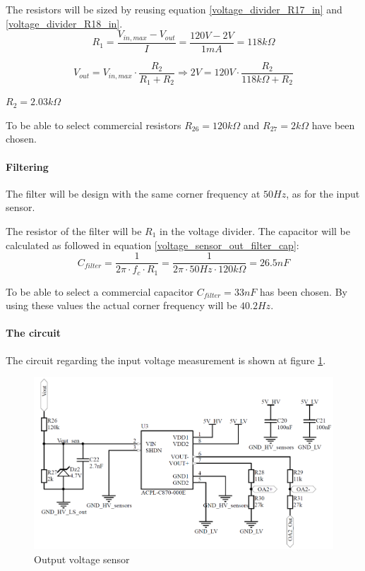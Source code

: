 \noindent The resistors will be sized by reusing equation \ref{voltage_divider_R17_in} and \ref{voltage_divider_R18_in}.
\begin{equation}
	R_{1} = \frac{V_{in,max}-V_{out}}{I} = \frac{120V-2V}{1mA} = 118k\Omega	
\end{equation}

\begin{equation} 
	V_{out} = V_{in,max} \cdot \frac{R_{2}}{R_{1}+R_{2}} \Rightarrow 2V = 120V \cdot \frac{R_{2}}{118k\Omega+R_{2}}
\end{equation}
\begin{center}
	$R_{2} = 2.03k\Omega$
\end{center}

\noindent To be able to select commercial resistors $R_{26} = 120k\Omega$ and $R_{27} = 2k\Omega$ have been chosen. 

\paragraph{Filtering}
The filter will be design with the same corner frequency at $50Hz$, as for the input sensor.

The resistor of the filter will be $R_{1}$ in the voltage divider. The capacitor will be calculated as followed in equation \ref{voltage_sensor_out_filter_cap}:
\begin{equation} \label{voltage_sensor_out_filter_cap}
	C_{filter} = \frac{1}{2\pi \cdot f_c \cdot R_{1}} = \frac{1}{2 \pi \cdot 50Hz \cdot 120k\Omega} = 26.5nF
\end{equation}

To be able to select a commercial capacitor $C_{filter} = 33nF$ has been chosen. By using these values the actual corner frequency will be $40.2 Hz$.

\paragraph{The circuit}
The circuit regarding the input voltage measurement is shown at figure \ref{fig:output_voltage_sensor_circuit}. 

\begin{figure}[H]
	\begin{center}
		\includegraphics[width=0.7\linewidth]{../Pictures/P1/Sensors/output_voltage_sensor.PNG}
		\caption{Output voltage sensor}
		\label{fig:output_voltage_sensor_circuit}
	\end{center}
\end{figure}

